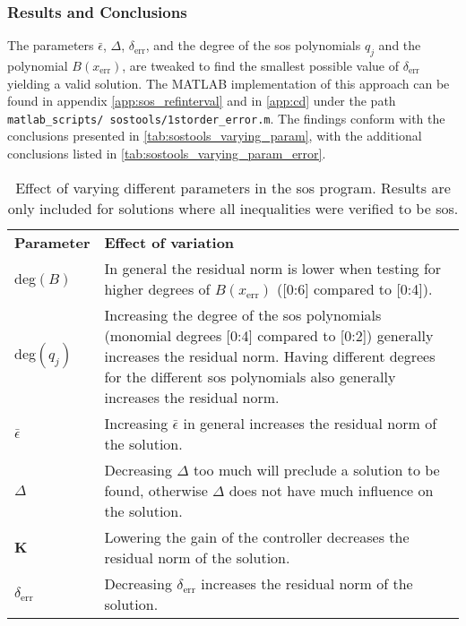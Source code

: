 \subsubsection{Results and Conclusions}

\vspace{-2mm}
The parameters $\bar{\epsilon}$, $\Delta$, $\delta_\text{err}$, and the degree of the \gls{sos} polynomials $q_j$ and the polynomial $B(x_\text{err})$, are tweaked to find the smallest possible value of $\delta_\text{err}$ yielding a valid solution.
The MATLAB implementation of this approach can be found in appendix \ref{app:sos_refinterval} and in \autoref{app:cd} under the path \texttt{matlab\_scripts/ sostools/1storder\_error.m}.
The findings conform with the conclusions presented in \autoref{tab:sostools_varying_param}, with the additional conclusions listed in \autoref{tab:sostools_varying_param_error}.

 





\begin{table}[htbp]
\begin{tabularx}{\textwidth}{l X}
\rowcolor{HeaderBlue}
\textbf{Parameter} & \textbf{Effect of variation}\\
deg$(B)$ & In general the residual norm is lower when testing for higher degrees of $B(x_\text{err})$ ([0:6] compared to [0:4]).\\
\rowcolor{textBlue}
deg$(q_j)$ & Increasing the degree of the \gls{sos} polynomials (monomial degrees [0:4] compared to [0:2]) generally increases the residual norm. Having different degrees for the different \gls{sos} polynomials also generally increases the residual norm.\\
$\bar{\epsilon}$ & Increasing $\bar{\epsilon}$ in general increases the residual norm of the solution. \\
\rowcolor{textBlue}
$\Delta$ & Decreasing $\Delta$ too much will preclude a solution to be found, otherwise $\Delta$ does not have much influence on the solution.\\
\textbf{K} & Lowering the gain of the controller decreases the residual norm of the solution.\\
\rowcolor{textBlue}
$\delta_\text{err}$ & Decreasing $\delta_\text{err}$ increases the residual norm of the solution. %
\end{tabularx}
\caption{Effect of varying different parameters in the \gls{sos} program. Results are only included for solutions where all inequalities were verified to be \gls{sos}.}
\label{tab:sostools_varying_param_error}
\end{table}

